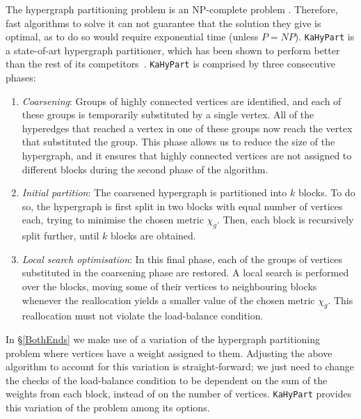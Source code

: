 The hypergraph partitioning problem is an NP-complete problem \citep{NP-complete}. Therefore, fast algorithms to solve it can not guarantee that the solution they give is optimal, as to do so would require exponential time (unless \(P = NP\)). \texttt{KaHyPart} is a state-of-art hypergraph partitioner, which has been shown to perform better than the rest of its competitors~\citep{KaHyPart}. \texttt{KaHyPart} is comprised by three consecutive phases:

\begin{enumerate}
  \item \textit{Coarsening}: Groups of highly connected vertices are identified, and each of these groups is temporarily substituted by a single vertex. All of the hyperedges that reached a vertex in one of these groups now reach the vertex that substituted the group. This phase allows us to reduce the size of the hypergraph, and it ensures that highly connected vertices are not assigned to different blocks during the second phase of the algorithm.
  \item \textit{Initial partition}: The coarsened hypergraph is partitioned into \(k\) blocks. To do so, the hypergraph is first split in two blocks with equal number of vertices each, trying to minimise the chosen metric \(\chi_g\). Then, each block is recursively split further, until \(k\) blocks are obtained.
  \item \textit{Local search optimisation}: In this final phase, each of the groups of vertices substituted in the coarsening phase are restored. A local search is performed over the blocks, moving some of their vertices to neighbouring blocks whenever the reallocation yields a smaller value of the chosen metric \(\chi_g\). This reallocation must not violate the load-balance condition.
\end{enumerate}

In \S\ref{BothEnds} we make use of a variation of the hypergraph partitioning problem where vertices have a weight assigned to them. Adjusting the above algorithm to account for this variation is straight-forward; we just need to change the checks of the load-balance condition to be dependent on the sum of the weights from each block, instead of on the number of vertices. \texttt{KaHyPart} provides this variation of the problem among its options.
